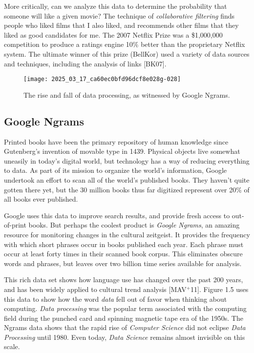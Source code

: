 \documentclass[10pt]{article}
\begin{document}
More critically, can we analyze this data to determine the probability that someone will like a given movie? The technique of \textit{collaborative filtering} finds people who liked films that I also liked, and recommends other films that they liked as good candidates for me. The 2007 Netflix Prize was a \$1,000,000 competition to produce a ratings engine 10\% better than the proprietary Netflix system. The ultimate winner of this prize (BellKor) used a variety of data sources and techniques, including the analysis of links [BK07].

\begin{figure}[h]
\centering
\texttt{[image: 2025\_03\_17\_ca60ec0bfd96dcf8e028g-028]}
\caption{The rise and fall of data processing, as witnessed by Google Ngrams.}
\end{figure}

\subsection{Google Ngrams}
Printed books have been the primary repository of human knowledge since Gutenberg's invention of movable type in 1439. Physical objects live somewhat uneasily in today's digital world, but technology has a way of reducing everything to data. As part of its mission to organize the world's information, Google undertook an effort to scan all of the world's published books. They haven't quite gotten there yet, but the 30 million books thus far digitized represent over 20\% of all books ever published.

Google uses this data to improve search results, and provide fresh access to out-of-print books. But perhaps the coolest product is \textit{Google Ngrams}, an amazing resource for monitoring changes in the cultural zeitgeist. It provides the frequency with which short phrases occur in books published each year. Each phrase must occur at least forty times in their scanned book corpus. This eliminates obscure words and phrases, but leaves over two billion time series available for analysis.

This rich data set shows how language use has changed over the past 200 years, and has been widely applied to cultural trend analysis [MAV$^+$11]. Figure 1.5 uses this data to show how the word \textit{data} fell out of favor when thinking about computing. \textit{Data processing} was the popular term associated with the computing field during the punched card and spinning magnetic tape era of the 1950s. The Ngrams data shows that the rapid rise of \textit{Computer Science} did not eclipse \textit{Data Processing} until 1980. Even today, \textit{Data Science} remains almost invisible on this scale.
\end{document}
